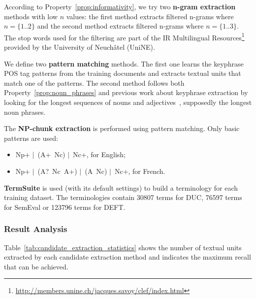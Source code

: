       According to Property~\ref{prop:informativity}, we try two \textbf{n-gram
      extraction} methods with low $n$ values: the first method extracts
      filtered n-grams where $n = \{1..2\}$ and the second method extracts
      filtered n-grams where $n = \{1..3\}$. The stop words used for the
      filtering are part of the IR Multilingual
      Resources\footnote{\url{http://members.unine.ch/jacques.savoy/clef/index.html}}
      provided by the University of Neuchâtel (UniNE).

      We define two \textbf{pattern matching} methods. The first one learns the
      keyphrase POS tag patterns from the training documents and extracts
      textual units that match one of the patterns. The second method follows
      both Property~\ref{prop:noun_phrases} and previous work about keyphrase
      extraction by looking for the longest sequences of nouns and
      adjectives~\cite{wan2008expandrank,hassan2010conundrums}, supposedly the
      longest noun phrases.

      The \textbf{NP-chunk extraction} is performed using pattern matching. Only
      basic patterns are used:
      \begin{itemize}
        \item{Np+ $|$~(A+~Nc) $|$~Nc+, for English;}
        \item{Np+ $|$~(A?~Nc~A+) $|$~(A~Nc) $|$~Nc+, for French.}
      \end{itemize}


      \textbf{TermSuite} is used (with its default settings) to build a
      terminology for each training dataset. The terminologies contain 30807
      terms for DUC, 76597 terms for SemEval or 123796 terms for DEFT.

    \subsubsection{Result Analysis}
    \label{subsubsec:candidate_extraction_result_analysis}
      Table~\ref{tab:candidate_extraction_statistics} shows the number of
      textual units extracted by each candidate extraction method and indicates
      the maximum recall that can be achieved.

